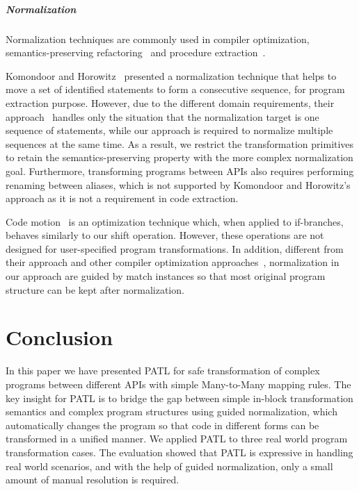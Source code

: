 \documentclass[a4paper, USenglish]{lipics-v2016}
\newcommand{\PATL}{PATL\xspace}
\theoremstyle{plain}
\begin{document}
\subparagraph*{Normalization}
Normalization techniques are commonly used in compiler
optimization\cite{Knoop:1992:LCM:143095.143136,Aho:2006:CPT:1177220,DBLP:conf/sefm/KanadeSK06,Wegman:1991:CPC:103135.103136,Callahan:1986:ICP:12276.13327}, semantics-preserving
refactoring~\cite{Opdyke:1992:ROF:169783,Roberts:1999:PAR:929806} and procedure extraction~\cite{komondoor2000semantics}. 

Komondoor and Horowitz~\cite{komondoor2000semantics}
presented a normalization technique that helps to move a set of
identified statements to form a consecutive sequence, for program
extraction purpose. However, due to the different domain
requirements, their approach~\cite{komondoor2000semantics} handles
only the situation that the normalization target is one sequence of
statements, while our approach is required to normalize multiple
sequences at the same time. As a result, we restrict the
transformation primitives to retain the semantics-preserving
property with the more complex normalization goal. Furthermore,
transforming programs between APIs also requires performing renaming
between aliases, which is not supported by Komondoor and Horowitz's
approach \cite{komondoor2000semantics} as it is not a requirement in code extraction.

Code motion~\cite{Knoop:1992:LCM:143095.143136} is an optimization technique which, when applied to
if-branches, behaves similarly to our shift operation. However, these operations are not designed for user-specified program
transformations. In addition, different from their approach and other compiler optimization approaches~\cite{Aho:2006:CPT:1177220,DBLP:conf/sefm/KanadeSK06,Wegman:1991:CPC:103135.103136,Callahan:1986:ICP:12276.13327}, normalization in our approach are guided by match instances so that most original program structure can be kept after normalization.


\section{Conclusion}\label{sec:conclusion}
In this paper we have presented \PATL for safe transformation of complex programs between different APIs with simple Many-to-Many mapping rules. The key insight for \PATL is to bridge the gap between simple in-block transformation semantics and complex program structures using guided normalization, which automatically changes the program so that code in different forms can be transformed in a unified manner. We applied \PATL to three real world program transformation cases. The evaluation showed that \PATL is expressive in handling real world scenarios, and with the help of guided normalization, only a small amount of manual resolution is required.
\end{document}
